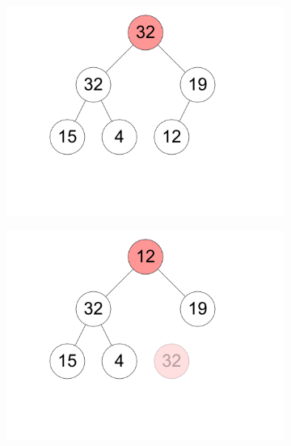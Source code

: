 \documentclass[11pt,a4paper]{article}
\begin{document}
\begin{loesung}
\begin{enumerate}
\begin{figure}[h!]
\begin{subfigure}[b]{0.23\textwidth}
                \includegraphics[width=\textwidth]{img/b10}
            \end{subfigure}
            \begin{subfigure}[b]{0.23\textwidth}
                \centering
                \includegraphics[width=\textwidth]{img/b11}
            \end{subfigure}
            \begin{subfigure}[b]{0.23\textwidth}
                \centering

\end{subfigure}
\end{figure}
\end{enumerate}
\end{loesung}
\end{document}
